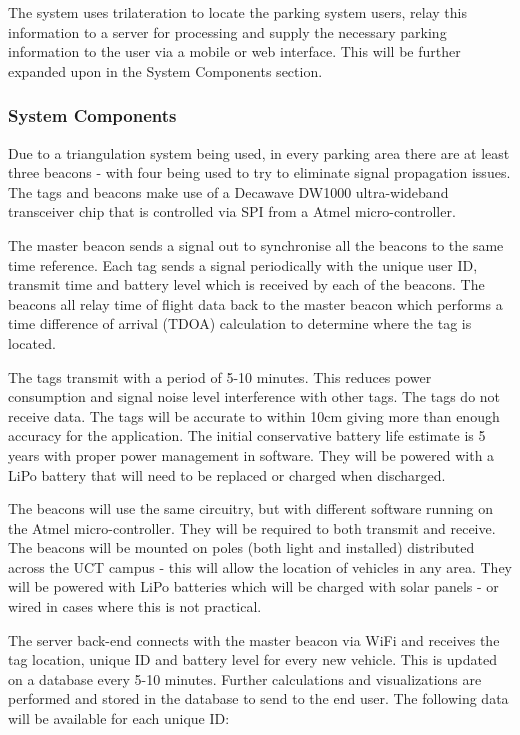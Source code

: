 The system uses trilateration to locate the parking system users, relay this information to a server for processing and supply the necessary parking information to the user via a mobile or web interface. This will be further expanded upon in the System Components section.

\subsubsection{System Components}
Due to a triangulation system being used, in every parking area there are at least three beacons - with four being used to try to eliminate signal propagation issues. The tags and beacons make use of a Decawave DW1000 ultra-wideband transceiver chip that is controlled via SPI from a Atmel micro-controller. 

The master beacon sends a signal out to synchronise all the beacons to the same time reference. Each tag sends a signal periodically with the unique user ID, transmit time and battery level which is received by each of the beacons. The beacons all relay time of flight data back to the master beacon which performs a time difference of arrival (TDOA) calculation to determine where the tag is located.\cite{decawave-presentation}

The tags transmit with a period of 5-10 minutes. This reduces power consumption and signal noise level interference with other tags. The tags do not receive data. The tags will be accurate to within 10cm giving more than enough accuracy for the application. The initial conservative battery life estimate is 5 years with proper power management in software. They will be powered with a LiPo battery that will need to be replaced or charged when discharged.

The beacons will use the same circuitry, but with different software running on the Atmel micro-controller. They will be required to both transmit and receive. The beacons will be mounted on poles (both light and installed) distributed across the UCT campus - this will allow the location of vehicles in any area. They will be powered with LiPo batteries which will be charged with solar panels - or wired in cases where this is not practical.

The server back-end connects with the master beacon via WiFi and receives the tag location, unique ID and battery level for every new vehicle. This is updated on a database every 5-10 minutes. Further calculations and visualizations are performed and stored in the database to send to the end user. The following data will be available for each unique ID:

